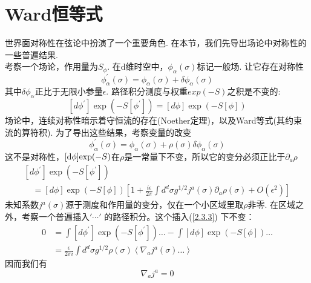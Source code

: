 \section{Ward恒等式}%
世界面对称性在弦论中扮演了一个重要角色. 在本节，我们先导出场论中对称性的一些普遍结果.\\
考察一个场论，作用量为$S_\phi$. 在d维时空中，$\phi_\alpha(\sigma)$标记一般场. 让它存在对称性
\begin{equation}
\phi_{\alpha}^{\prime}(\sigma)=\phi_{\alpha}(\sigma)+\delta \phi_{\alpha}(\sigma)
\end{equation}
其中$\delta \phi_\alpha$正比于无限小参量$\epsilon$. 路径积分测度与权重$exp(-S)$之积是不变的:
\begin{equation}
\left[d \phi^{\prime}\right] \exp \left(-S\left[\phi^{\prime}\right]\right)=[d \phi] \exp (-S[\phi])
\end{equation}
场论中，连续对称性暗示着守恒流的存在(Noether定理)，以及Ward等式(其约束流的算符积). 为了导出这些结果，考察变量的改变
\begin{equation}\label{2.3.3}
\phi_{\alpha}^{\prime}(\sigma)=\phi_{\alpha}(\sigma)+\rho(\sigma) \delta \phi_{\alpha}(\sigma)
\end{equation}
这不是对称性，$[\mathrm{d} \phi]\mathrm{exp}(-S)$在$\rho$是一常量下不变，所以它的变分必须正比于$\partial _a \rho$
\begin{equation}
\begin{array}{l}
{\left[d \phi^{\prime}\right] \exp \left(-S\left[\phi^{\prime}\right]\right)} \\
\quad=[d \phi] \exp (-S[\phi])\left[1+\frac{i \epsilon}{2 \pi} \int d^{d} \sigma g^{1 / 2} j^{a}(\sigma) \partial_{a} \rho(\sigma)+O\left(\epsilon^{2}\right)\right]
\end{array}
\end{equation}
未知系数$j^a(\sigma)$源于测度和作用量的变分，仅在一个小区域里取$\rho$非零. 在区域之外，考察一个普遍插入$'\cdots'$ 的路径积分。这个插入(\ref{2.3.3}) 下不变：
\begin{equation}
\begin{aligned}
0 &=\int\left[d \phi^{\prime}\right] \exp \left(-S\left[\phi^{\prime}\right]\right) \ldots-\int[d \phi] \exp (-S[\phi]) \ldots \\
&=\frac{\epsilon}{2 \pi i} \int d^{d} \sigma g^{1 / 2} \rho(\sigma)\left\langle\nabla_{a} j^{a}(\sigma) \ldots\right\rangle
\end{aligned}
\end{equation}
因而我们有
\begin{equation}
\nabla_{a} j^{a}=0
\end{equation}

